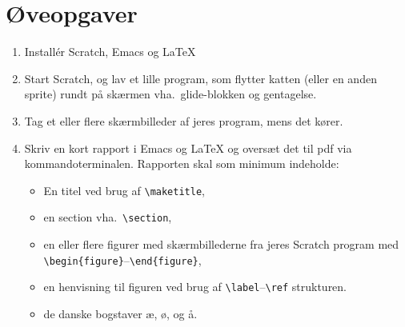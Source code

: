 \documentclass[a4paper,12pt]{article}
\newcounter{exerciseNumber}
\begin{document}
\section*{Øveopgaver}
\begin{enumerate}[label=\theexerciseNumber ø.\arabic*,start=0]
\item Install\'{e}r Scratch, Emacs og LaTeX
\item Start Scratch, og lav et lille program, som flytter katten (eller en anden sprite) rundt på skærmen vha.\ glide-blokken og gentagelse.
\item Tag et eller flere skærmbilleder af jeres program, mens det kører.
\item Skriv en kort rapport i Emacs og LaTeX og oversæt det til pdf via kommandoterminalen. Rapporten skal som minimum indeholde:
  \begin{itemize}
  \item En titel ved brug af \verb|\maketitle|, 
  \item en section vha.\ \verb|\section|,
  \item en eller flere figurer med skærmbillederne fra jeres Scratch program med \verb|\begin{figure}|--\verb|\end{figure}|,
  \item en henvisning til figuren ved brug af \verb|\label|--\verb|\ref| strukturen.
  \item de danske bogstaver æ, ø, og å.
  \end{itemize}
\end{enumerate}
\end{document}
